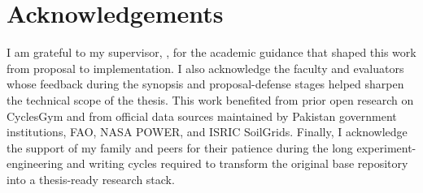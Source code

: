 \chapter*{Acknowledgements}
\thispagestyle{empty}
I am grateful to my supervisor, \SupervisorName, for the academic guidance that shaped this work from proposal to implementation. I also acknowledge the faculty and evaluators whose feedback during the synopsis and proposal-defense stages helped sharpen the technical scope of the thesis. This work benefited from prior open research on CyclesGym and from official data sources maintained by Pakistan government institutions, FAO, NASA POWER, and ISRIC SoilGrids. Finally, I acknowledge the support of my family and peers for their patience during the long experiment-engineering and writing cycles required to transform the original base repository into a thesis-ready research stack.
\clearpage
